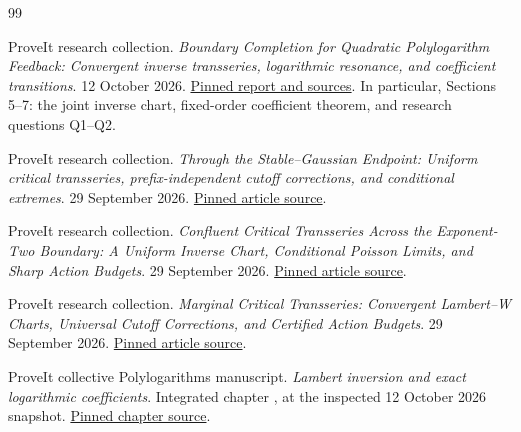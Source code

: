 \clearpage
\begin{thebibliography}{99}

ProveIt research collection.
\emph{Boundary Completion for Quadratic Polylogarithm Feedback:
Convergent inverse transseries, logarithmic resonance, and coefficient
transitions}. 12 October 2026.
\href{https://github.com/VladimirReshetnikov/ProveIt/tree/8f5afd4d7565df808359f6a0c22f87f79a119bb9/Analysis/Transseries/docs/series-and-transseries/Quadratic_Polylogarithm_Feedback_Boundary_Completion}{Pinned report and sources}.
In particular, Sections 5--7: the joint inverse chart, fixed-order
coefficient theorem, and research questions Q1--Q2.

ProveIt research collection.
\emph{Through the Stable--Gaussian Endpoint:
Uniform critical transseries, prefix-independent cutoff corrections,
and conditional extremes}. 29 September 2026.
\href{https://github.com/VladimirReshetnikov/ProveIt/blob/8f5afd4d7565df808359f6a0c22f87f79a119bb9/Analysis/Transseries/docs/series-and-transseries/Stable_Gaussian_Endpoint_Uniform_Critical_Transseries/article.tex}{Pinned article source}.

ProveIt research collection.
\emph{Confluent Critical Transseries Across the Exponent-Two Boundary:
A Uniform Inverse Chart, Conditional Poisson Limits, and Sharp
Action Budgets}. 29 September 2026.
\href{https://github.com/VladimirReshetnikov/ProveIt/blob/8f5afd4d7565df808359f6a0c22f87f79a119bb9/Analysis/Transseries/docs/series-and-transseries/Confluent_Critical_Transseries_Exponent_Two_Boundary/Confluent_Critical_Transseries.tex}{Pinned article source}.

ProveIt research collection.
\emph{Marginal Critical Transseries:
Convergent Lambert--W Charts, Universal Cutoff Corrections,
and Certified Action Budgets}. 29 September 2026.
\href{https://github.com/VladimirReshetnikov/ProveIt/blob/8f5afd4d7565df808359f6a0c22f87f79a119bb9/Analysis/Transseries/docs/series-and-transseries/Marginal_Critical_Transseries_Action_Budgets/Marginal_Critical_Transseries.tex}{Pinned article source}.

ProveIt collective Polylogarithms manuscript.
\emph{Lambert inversion and exact logarithmic coefficients}.
Integrated chapter , at the inspected
12 October 2026 snapshot.
\href{https://github.com/VladimirReshetnikov/ProveIt/blob/8f5afd4d7565df808359f6a0c22f87f79a119bb9/Analysis/Polylogarithms/docs/manuscript/chapters/01-lambert-moments.tex}{Pinned chapter source}.


\end{thebibliography}
